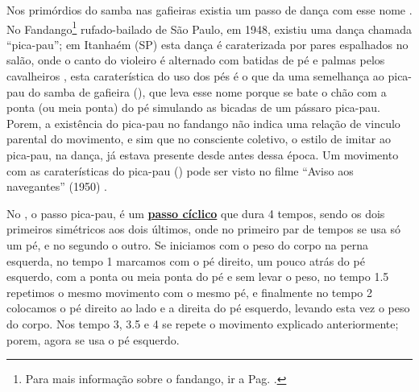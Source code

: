 Nos primórdios do samba nas gafieiras existia um passo de dança com esse nome \cite[pp. 142]{perna2002samba}.
No Fandango\footnote{Para mais informação sobre o fandango, ir a Pag. \pageref{fig:fandango}.} 
rufado-bailado de São Paulo, em 1948, existiu uma dança chamada ``pica-pau'';
em Itanhaém (SP) esta dança é caraterizada por pares espalhados no salão,
onde o canto do violeiro é alternado com batidas de pé e palmas pelos 
cavalheiros \cite[pp. 607-608]{marcondes1977enciclopediav2} \cite[pp. 49]{fandangoSP},
esta caraterística do uso dos pés é o que da uma semelhança ao pica-pau do samba de gafieira (\AnoLivro),
que leva esse nome porque se bate o chão com a ponta (ou meia ponta) do pé simulando as bicadas de um pássaro pica-pau.
Porem, a existência do pica-pau no fandango não indica uma relação de vinculo parental do movimento,
e sim que no consciente coletivo, o estilo de imitar ao pica-pau, na dança,
já estava presente desde antes dessa época.
Um movimento com as caraterísticas do pica-pau (\AnoLivro) pode ser visto 
no filme ``Aviso aos navegantes'' (1950) \cite[min. 40:35]{AtlantidaDance}.


No \AnoLivro, o passo pica-pau, é um \hyperref[def:PassoCiclico]{\textbf{passo cíclico}} que dura 4 tempos, 
sendo os dois primeiros simétricos aos dois últimos, 
onde no primeiro par de tempos se usa só um pé,
e no segundo o outro.
Se iniciamos com o peso do corpo na perna esquerda, 
no tempo 1 marcamos com o pé direito, um pouco atrás do pé esquerdo, 
com a ponta ou meia ponta do pé e sem levar o peso,
no tempo 1.5 repetimos o mesmo movimento com o mesmo pé, e finalmente
no tempo 2 colocamos o pé direito ao lado e a direita do pé esquerdo, 
levando esta vez o peso do corpo. 
Nos tempo 3, 3.5 e 4 se repete o movimento explicado anteriormente; porem,
agora se usa o pé esquerdo.
  
